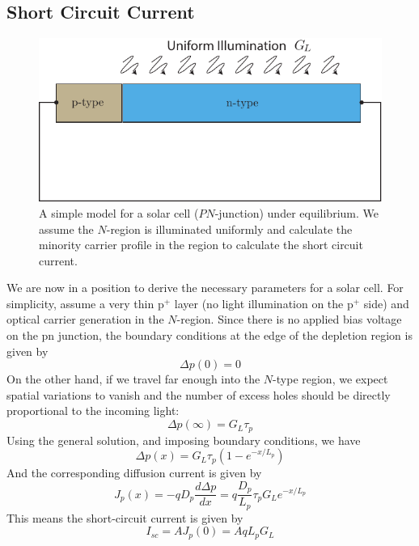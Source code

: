 \subsection{Short Circuit Current}
\begin{figure}[tb]
\centering
\includegraphics[width=.5\columnwidth]{pn_solar_cell}
\caption{A simple model for a solar cell ($PN$-junction) under equilibrium.  We assume the $N$-region is illuminated uniformly and calculate the minority carrier profile in the region to calculate the short circuit current.}
\label{fig:pn_solar_cell}
\end{figure}
We are now in a position to derive the necessary parameters for a solar cell.   For simplicity, assume a very thin p$^+$ layer (no light illumination on the p$^+$ side) and optical carrier generation in the $N$-region.  Since there is no applied bias voltage on the pn junction, the boundary conditions at the edge of the depletion region is given by
    \begin{equation} 
        \Delta p(0) = 0  
    \end{equation}
On the other hand, if we travel far enough into the $N$-type region, we expect spatial variations to vanish and the number of excess holes should be directly proportional to the incoming light:
    \begin{equation} 
        \Delta p(\infty) = G_L \tau_p  
    \end{equation}
Using the general solution, and imposing boundary conditions, we have 
    \begin{equation} 
        \Delta p(x) = G_L \tau_p \left(1 - e^{-x/L_p} \right)   
    \end{equation}
 And the corresponding diffusion current is given by
    \begin{equation} 
        J_p(x) = - q D_p \frac{d \Delta p}{dx} = q \frac{D_p}{L_p}  \tau_p G_L  e^{-x/L_p}  
    \end{equation}
This means the short-circuit current is given by
    \begin{equation} 
        I_{sc} = A J_p(0) = A q L_p G_L 
    \end{equation}
